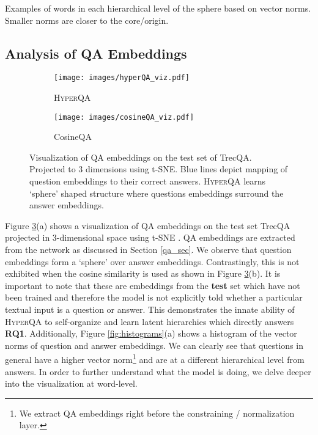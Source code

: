 \documentclass[sigconf]{acmart}
\begin{document}
\begin{table}[htbp]
    \caption{Examples of words in each hierarchical level of the sphere based on vector norms. Smaller norms are closer to the core/origin.}
  \label{tab:word_norms}\end{table}\subsection{Analysis of QA Embeddings}

\begin{figure}[H]
\centering
\begin{subfigure}{0.24\textwidth}
  \centering
  \texttt{[image: images/hyperQA\_viz.pdf]}
  \caption{\textsc{HyperQA}}
  \label{fig:sub1}
\end{subfigure}\begin{subfigure}{0.24\textwidth}
  \centering
  \texttt{[image: images/cosineQA\_viz.pdf]}
  \caption{CosineQA}
  \label{fig:sub2}
\end{subfigure}
\caption{Visualization of QA embeddings on the test set of TrecQA. Projected to 3 dimensions using t-SNE. Blue lines depict mapping of question embeddings to their correct answers. \textsc{HyperQA} learns `sphere' shaped structure where questions embeddings surround the answer embeddings.}
\label{fig:viz_qa}
\end{figure}


Figure \ref{fig:viz_qa}(a) shows a visualization of QA embeddings on the test set TrecQA projected in 3-dimensional space using t-SNE \cite{DBLP:journals/jmlr/Maaten09}. QA embeddings are extracted from the network as discussed in Section \ref{qa_sec}. We observe that question embeddings form a `sphere' over answer embeddings. Contrastingly, this is not exhibited when the cosine similarity is used as shown in Figure \ref{fig:viz_qa}(b). It is important to note that these are embeddings from the \textbf{test} set which have not been trained and therefore the model is not explicitly told whether a particular textual input is a question or answer. This demonstrates the innate ability of \textsc{HyperQA} to self-organize and learn latent hierarchies which directly answers \textbf{RQ1}. Additionally, Figure \ref{fig:histograms}(a) shows a histogram of the vector norms of question and answer embeddings. We can clearly see that questions in general have a higher vector norm\footnote{We extract QA embeddings right before the constraining / normalization layer.} and are at a different hierarchical level from answers. In order to further understand what the model is doing, we delve deeper into the visualization at word-level.  
\end{document}
